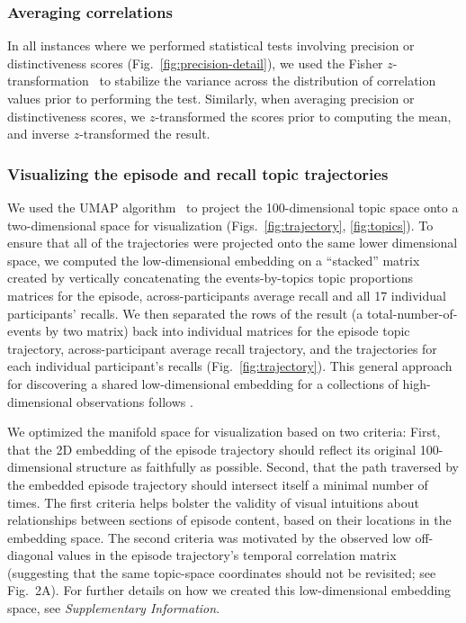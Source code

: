 \documentclass[10pt]{article}
\begin{document}
\subsubsection*{Averaging correlations}
In all instances where we performed statistical tests involving precision or distinctiveness scores (Fig.~\ref{fig:precision-detail}), we used the Fisher $z$-transformation~\citep{Fish25} to stabilize the variance across the distribution of correlation values prior to performing the test.  Similarly, when averaging precision or distinctiveness scores, we $z$-transformed the scores prior to computing the mean, and inverse $z$-transformed the result.

\subsubsection*{Visualizing the episode and recall topic trajectories}
We used the UMAP algorithm~\citep{McInEtal18} to project the 100-dimensional topic space onto a two-dimensional space for visualization (Figs.~\ref{fig:trajectory}, \ref{fig:topics}).  To ensure that all of the trajectories were projected onto the same lower dimensional space, we computed the low-dimensional embedding on a ``stacked'' matrix created by vertically concatenating the events-by-topics topic proportions matrices for the episode, across-participants average recall and all 17 individual participants' recalls.  We then separated the rows of the result (a total-number-of-events by two matrix) back into individual matrices for the episode topic trajectory, across-participant average recall trajectory, and the trajectories for each individual participant's recalls (Fig.~\ref{fig:trajectory}).  This general approach for discovering a shared low-dimensional embedding for a collections of high-dimensional observations follows \cite{HeusEtal18a}.

We optimized the manifold space for visualization based on two criteria: First, that the 2D embedding of the episode trajectory should reflect its original 100-dimensional structure as faithfully as possible. Second, that the path traversed by the embedded episode trajectory should intersect itself a minimal number of times.  The first criteria helps bolster the validity of visual intuitions about relationships between sections of episode content, based on their locations in the embedding space.  The second criteria was motivated by the observed low off-diagonal values in the episode trajectory's temporal correlation matrix (suggesting that the same topic-space coordinates should not be revisited; see Fig.~2A). For further details on how we created this low-dimensional embedding space, see \textit{Supplementary Information}.
\end{document}
